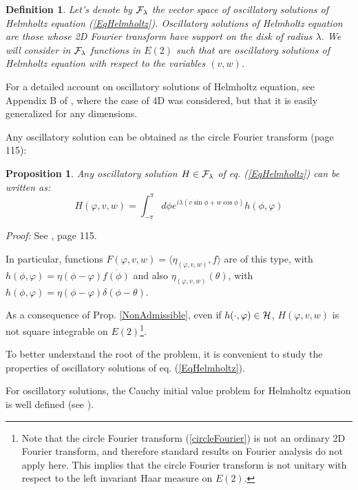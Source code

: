 \documentclass[11pt]{article}
\newtheorem{definition}{Definition}[section]
\newtheorem{proposition}{Proposition}[section]
\begin{document}
 \begin{definition}
  Let's denote by ${\cal F}_\lambda$ the vector space of oscillatory solutions of Helmholtz equation (\ref{EqHelmholtz}). Oscillatory solutions of Helmholtz equation are those whose 2D Fourier transform have support on the disk of radius $\lambda$. We will consider in ${\cal F}_\lambda$ functions in $E(2)$ such that are oscillatory solutions of Helmholtz equation with respect to the variables $(v,w)$.
 \end{definition}

 For a detailed account on oscillatory solutions of Helmholtz equation, see Appendix B of \cite{SphereMomentum20}, where the case of 4D was considered, but that it is easily generalized for any dimensions. 
 
 Any oscillatory solution can be obtained as the circle Fourier transform \cite{Wolf89} (page 115):
 
 \begin{proposition}
  Any oscillatory solution $H\in {\cal F}_\lambda$ of eq. (\ref{EqHelmholtz}) can be written as:
  \begin{equation}
   H(\varphi,v,w) =\int_{-\pi}^\pi d\phi e^{i\lambda(v\sin\phi + w \cos\phi)}h(\phi,\varphi)
   \label{circleFourier}
  \end{equation}
  \end{proposition}
  
  \noindent \textit{Proof:} See \cite{Wolf89}, page 115.
  
  In particular, functions $F(\varphi,v,w)=\langle \eta_{(\varphi,v,w)},f\rangle$ are of this type, with $h(\phi,\varphi)=\eta(\phi-\varphi)\overline{f(\phi)}$ and also $\eta_{(\varphi,v,w)}(\theta)$, with $h(\phi,\varphi)=\eta(\phi-\varphi)\delta(\phi-\theta)$.

  
 As a consequence of Prop.  \ref{NonAdmissible}, even if $h(\cdot,\varphi)\in{\cal H}$, $H(\varphi,v,w)$ is not square integrable on $E(2)$\footnote{Note that the circle Fourier transform (\ref{circleFourier}) is not an ordinary 2D Fourier transform, and therefore standard results on Fourier analysis do not apply here. This implies that the circle Fourier transform is not unitary with respect to the left invariant Haar measure on $E(2)$.}.
 
 To better understand the root of the problem, it is convenient to study the properties of oscillatory solutions of eq. (\ref{EqHelmholtz}).
 
 For oscillatory solutions, the Cauchy initial value problem for Helmholtz equation is well defined (see \cite{Wolf81,SphereMomentum20}).
  
\end{document}
